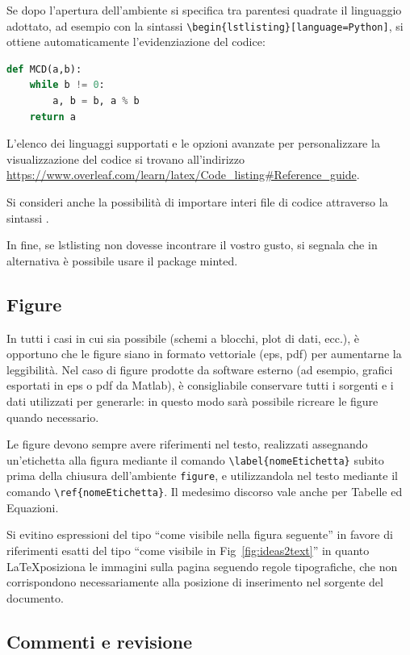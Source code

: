 \documentclass[12pt]{report}
\begin{document}
Se dopo l'apertura dell'ambiente si specifica tra parentesi quadrate il linguaggio adottato, ad esempio con la sintassi \verb|\begin{lstlisting}[language=Python]|, si ottiene automaticamente l'evidenziazione del codice:

\begin{lstlisting}[language=Python]
def MCD(a,b):
	while b != 0:
		a, b = b, a % b
	return a
\end{lstlisting}

L'elenco dei linguaggi supportati e le opzioni avanzate per personalizzare la visualizzazione del codice si trovano all'indirizzo \url{https://www.overleaf.com/learn/latex/Code_listing#Reference_guide}.

Si consideri anche la possibilità di importare interi file di codice attraverso la sintassi \verb||.

In fine, se lstlisting non dovesse incontrare il vostro gusto, si segnala che in alternativa è possibile usare il package minted.

\subsection{Figure}

In tutti i casi in cui sia possibile (schemi a blocchi, plot di dati, ecc.), \`e opportuno che le figure siano in formato vettoriale (eps, pdf) per aumentarne la leggibilit\`a.
Nel caso di figure prodotte da software esterno (ad esempio, grafici esportati in eps o pdf da Matlab), \`e consigliabile conservare tutti i sorgenti e i dati utilizzati per generarle: in questo modo sarà possibile ricreare le figure quando necessario.

Le figure devono sempre avere riferimenti nel testo, realizzati assegnando un'etichetta alla figura mediante il comando \verb|\label{nomeEtichetta}| subito prima della chiusura dell'ambiente \verb|figure|, e utilizzandola nel testo mediante il comando \verb|\ref{nomeEtichetta}|. Il medesimo discorso vale anche per Tabelle ed Equazioni.

Si evitino espressioni del tipo ``come visibile nella figura seguente'' in favore di riferimenti esatti del tipo ``come visibile in Fig~\ref{fig:ideas2text}'' in quanto \LaTeX posiziona le immagini sulla pagina seguendo regole tipografiche, che non corrispondono necessariamente alla posizione di inserimento nel sorgente del documento.

\subsection{Commenti e revisione}
\end{document}
